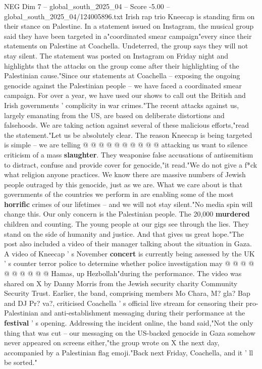 \begin{textsample}{NEG Dim 7 – global\_south\_2025\_04 – Score -5.00 – global\_south\_2025\_04/124005896.txt}  \label{ex:f7_neg_308}
Irish rap trio Kneecap is standing firm on their stance on Palestine.
In a statement issued on Instagram, the musical group said they have been targeted in a"coordinated smear campaign"every since their statements on Palestine at Coachella.
Undeterred, the group says they will not stay silent.
The statement was posted on Instagram on Friday night and highlights that the attacks on the group come after their highlighting of the Palestinian cause."Since our statements at Coachella -- exposing the ongoing genocide against the Palestinian people -- we have faced a coordinated smear campaign.
For over a year, we have used our shows to call out the British and Irish governments ' complicity in war crimes."The recent attacks against us, largely emanating from the US, are based on deliberate distortions and falsehoods.
We are taking action against several of these malicious efforts,"read the statement."Let us be absolutely clear.
The reason Kneecap is being targeted is simple -- we are telling @ @ @ @ @ @ @ @ @ @ attacking us want to silence criticism of a mass \textbf{slaughter}.
They weaponise false accusations of antisemitism to distract, confuse and provide cover for genocide,"it read."We do not give a f*ck what religion anyone practices.
We know there are massive numbers of Jewish people outraged by this genocide, just as we are.
What we care about is that governments of the countries we perform in are enabling some of the most \textbf{horrific} crimes of our lifetimes -- and we will not stay silent."No media spin will change this.
Our only concern is the Palestinian people.
The 20,000 \textbf{murdered} children and counting.
The young people at our gigs see through the lies.
They stand on the side of humanity and justice.
And that gives us great hope."The post also included a video of their manager talking about the situation in Gaza.
A video of Kneecap ' s November \textbf{concert} is currently being assessed by the UK ' s counter terror police to determine whether police investigation may @ @ @ @ @ @ @ @ @ @ Hamas, up Hezbollah"during the performance.
The video was shared on X by Danny Morris from the Jewish security charity Community Security Trust.
Earlier, the band, comprising members Mo Chara, M? gla?
Bap and DJ Pr? va?, criticised Coachella ' s official live stream for censoring their pro-Palestinian and anti-establishment messaging during their performance at the \textbf{festival} ' s opening.
Addressing the incident online, the band said,"Not the only thing that was cut -- our messaging on the US-backed genocide in Gaza somehow never appeared on screens either,"the group wrote on X the next day, accompanied by a Palestinian flag emoji."Back next Friday, Coachella, and it ' ll be sorted."

\end{textsample}
